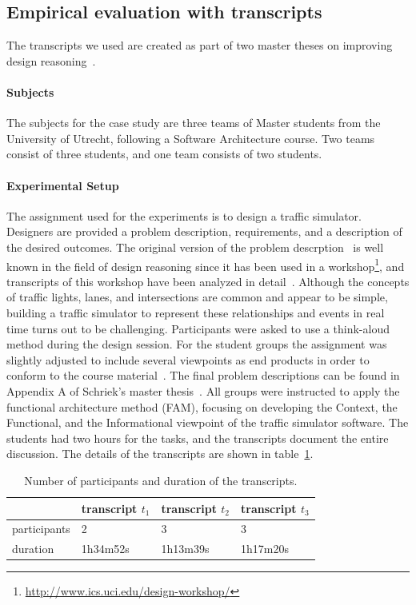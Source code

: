\documentclass[11.5pt,two column]{llncs}
\begin{document}
\subsection{Empirical evaluation with transcripts}

The transcripts we used are created as part of two master theses on improving design reasoning~\cite{masterthesis1,masterthesis2}.

\paragraph{Subjects} The subjects for the case study are three teams of Master students from the University of Utrecht, following a Software Architecture course. Two teams consist of three students, and one team consists of two students.

\paragraph{Experimental Setup} The assignment used for the experiments is to design a traffic simulator. Designers are provided a problem description, requirements, and a description of the desired outcomes. The original version of the problem descrption~\cite{UCIworkshop} is well known in the field of design reasoning since it has been used in a workshop\footnote{\url{http://www.ics.uci.edu/design-workshop/}}, and transcripts of this workshop have been analyzed in detail~\cite{Petre:2013:SDA:2535028}. Although the concepts of traffic lights, lanes, and intersections are common and appear to be simple, building a traffic simulator to represent these relationships and events in real time turns out to be challenging. Participants were asked to use a think-aloud method during the design session. For the student groups the assignment was slightly adjusted to include several viewpoints as end products in order to conform to the course material~\cite{Bass:2012:SAP:2392670}. The final problem descriptions can be found in Appendix A of Schriek's master thesis~\cite{masterthesis1}. All groups were instructed to apply the functional architecture method (FAM), focusing on developing the Context, the Functional, and the Informational viewpoint of the traffic simulator software. The students had two hours for the tasks, and the transcripts document the entire discussion. The details of the transcripts are shown in table~\ref{table:transcripts:info}.

\begin{table}[ht]
\centering
\begin{tabular}{|l|l|l|l|}
\hline
& transcript $t_1$ & transcript $t_2$ & transcript $t_3$\\
\hline
participants & 2 & 3 & 3\\
\hline
duration & 1h34m52s & 1h13m39s & 1h17m20s\\
\hline
\end{tabular}
\caption{Number of participants and duration of the transcripts.}
\label{table:transcripts:info}
\end{table}
\end{document}
